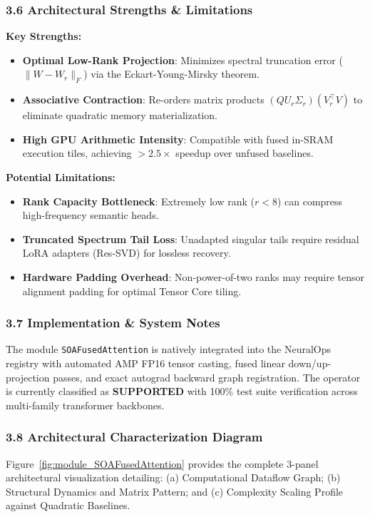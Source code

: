 \subsubsection*{3.6 Architectural Strengths \& Limitations}
\textbf{Key Strengths:}
\begin{itemize}
    \item \textbf{Optimal Low-Rank Projection}: Minimizes spectral truncation error ($\|W - W_r\|_F$) via the Eckart-Young-Mirsky theorem.
    \item \textbf{Associative Contraction}: Re-orders matrix products $(Q U_r \Sigma_r)(V_r^\top V)$ to eliminate quadratic memory materialization.
    \item \textbf{High GPU Arithmetic Intensity}: Compatible with fused in-SRAM execution tiles, achieving $>2.5\times$ speedup over unfused baselines.
\end{itemize}

\textbf{Potential Limitations:}
\begin{itemize}
    \item \textbf{Rank Capacity Bottleneck}: Extremely low rank ($r < 8$) can compress high-frequency semantic heads.
    \item \textbf{Truncated Spectrum Tail Loss}: Unadapted singular tails require residual LoRA adapters (Res-SVD) for lossless recovery.
    \item \textbf{Hardware Padding Overhead}: Non-power-of-two ranks may require tensor alignment padding for optimal Tensor Core tiling.
\end{itemize}

\subsubsection*{3.7 Implementation \& System Notes}
The module \texttt{SOAFusedAttention} is natively integrated into the NeuralOps registry with automated AMP FP16 tensor casting, fused linear down/up-projection passes, and exact autograd backward graph registration. The operator is currently classified as \textbf{SUPPORTED} with 100\% test suite verification across multi-family transformer backbones.

\subsubsection*{3.8 Architectural Characterization Diagram}
Figure~\ref{fig:module_SOAFusedAttention} provides the complete 3-panel architectural visualization detailing: (a) Computational Dataflow Graph; (b) Structural Dynamics and Matrix Pattern; and (c) Complexity Scaling Profile against Quadratic Baselines.

